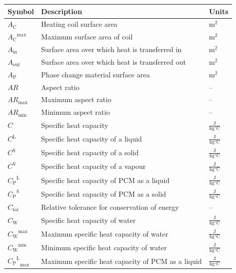 \documentclass[12pt]{article}
\begin{document}
\begin{longtabu}{l X[l] l}
\toprule
\textbf{Symbol} & \textbf{Description} & \textbf{Units}
\\
\midrule
\endhead
${A_{\text{C}}}$ & Heating coil surface area & ${\text{m}^{2}}$
\\
${{A_{\text{C}}}^{\text{max}}}$ & Maximum surface area of coil & ${\text{m}^{2}}$
\\
${A_{\text{in}}}$ & Surface area over which heat is transferred in & ${\text{m}^{2}}$
\\
${A_{\text{out}}}$ & Surface area over which heat is transferred out & ${\text{m}^{2}}$
\\
${A_{\text{P}}}$ & Phase change material surface area & ${\text{m}^{2}}$
\\
$AR$ & Aspect ratio & --
\\
${AR_{\text{max}}}$ & Maximum aspect ratio & --
\\
${AR_{\text{min}}}$ & Minimum aspect ratio & --
\\
$C$ & Specific heat capacity & $\frac{\text{J}}{\text{kg}{}^{\circ}\text{C}}$
\\
${C^{\text{L}}}$ & Specific heat capacity of a liquid & $\frac{\text{J}}{\text{kg}{}^{\circ}\text{C}}$
\\
${C^{\text{S}}}$ & Specific heat capacity of a solid & $\frac{\text{J}}{\text{kg}{}^{\circ}\text{C}}$
\\
${C^{\text{V}}}$ & Specific heat capacity of a vapour & $\frac{\text{J}}{\text{kg}{}^{\circ}\text{C}}$
\\
${{C_{\text{P}}}^{\text{L}}}$ & Specific heat capacity of PCM as a liquid & $\frac{\text{J}}{\text{kg}{}^{\circ}\text{C}}$
\\
${{C_{\text{P}}}^{\text{S}}}$ & Specific heat capacity of PCM as a solid & $\frac{\text{J}}{\text{kg}{}^{\circ}\text{C}}$
\\
${C_{\text{tol}}}$ & Relative tolerance for conservation of energy & --
\\
${C_{\text{W}}}$ & Specific heat capacity of water & $\frac{\text{J}}{\text{kg}{}^{\circ}\text{C}}$
\\
${{C_{\text{W}}}^{\text{max}}}$ & Maximum specific heat capacity of water & $\frac{\text{J}}{\text{kg}{}^{\circ}\text{C}}$
\\
${{C_{\text{W}}}^{\text{min}}}$ & Minimum specific heat capacity of water & $\frac{\text{J}}{\text{kg}{}^{\circ}\text{C}}$
\\
${{{C_{\text{P}}}^{\text{L}}}_{\text{max}}}$ & Maximum specific heat capacity of PCM as a liquid & $\frac{\text{J}}{\text{kg}{}^{\circ}\text{C}}$

\end{longtabu}
\end{document}
